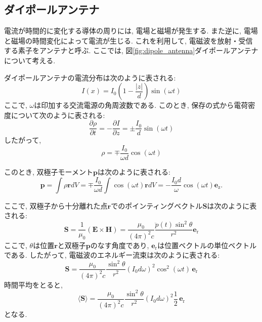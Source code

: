 \documentclass[uplatex,dvipdfmx,a4j,12pt]{jsarticle}
\begin{document}
\subsection{ダイポールアンテナ}
電流が時間的に変化する導体の周りには, 電場と磁場が発生する.
また逆に, 電場と磁場の時間変化によって電流が生じる.
これを利用して, 電磁波を放射・受信する素子をアンテナと呼ぶ.
ここでは, 図\ref{fig:dipole_antenna}ダイポールアンテナについて考える.

ダイポールアンテナの電流分布は次のように表される:
\begin{equation}
    I(x) = I_0 \left(1 - \frac{|z|}{d}\right)\sin\left(\omega t\right)
\end{equation}
ここで, $\omega$は印加する交流電源の角周波数である.
このとき, 保存の式から電荷密度について次のように表される:
\begin{equation}
  \frac{\partial \rho}{\partial t}  = - \frac{\partial I}{\partial z} = \pm \frac{I_0}{d}\sin\left(\omega t\right)
\end{equation}
したがって, 
\begin{equation}
  \rho = \mp \frac{I_0}{\omega d}\cos\left(\omega t\right)
\end{equation}

このとき, 双極子モーメント$\mathbf{p}$は次のように表される:
\begin{equation}
  \mathbf{p} = \int \rho \mathbf{r} dV = \mp \frac{I_0}{\omega d}\int \cos\left(\omega t\right) \mathbf{r} dV
  = -\frac{I_0 d}{\omega}\cos\left(\omega t\right) \mathbf{e}_\mathrm{z}.
\end{equation}

ここで, 双極子から十分離れた点$\mathbf{r}$でのポインティングベクトル$\mathbf{S}$は次のように表される:
\begin{equation}
  \mathbf{S} = \frac{1}{\mu_0}\left(\mathbf{E} \times \mathbf{H}\right) =
  \frac{\mu_0}{(4\pi)^2c} \frac{\ddot{p}(t)\sin^2\theta}{r^2}\mathbf{e}_\mathrm{r}
\end{equation}
ここで, $\theta$は位置$\mathbf{r}$と双極子$\mathbf{p}$のなす角度であり, $\mathbf{e}_\mathrm{r}$は位置ベクトルの単位ベクトルである.
したがって, 電磁波のエネルギー流束は次のように表される:
\begin{equation}
  \mathbf{S} = \frac{\mu_0}{(4\pi)^2c} \frac{\sin^2\theta}{r^2}(I_0 d \omega)^2 \cos^2\left(\omega t\right)\,\mathbf{e}_\mathrm{r}
\end{equation}
時間平均をとると,
\begin{equation}
  \langle \mathbf{S} \rangle = \frac{\mu_0}{(4\pi)^2c} \frac{\sin^2\theta}{r^2}(I_0 d \omega)^2 \frac{1}{2}\,\mathbf{e}_\mathrm{r}
\end{equation}
となる.
\end{document}
